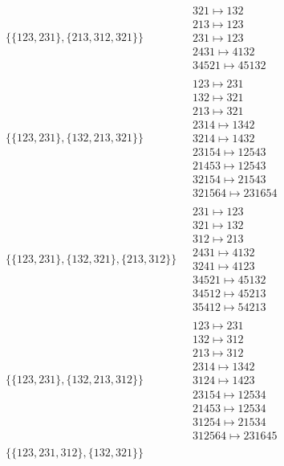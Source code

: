 \begin{scriptsize}
\begin{align}
\begin{matrix}
\end{matrix}
\\
\{\{123, 231\}, \{213, 312, 321\}\}
\ 
&
\begin{matrix}
321 \mapsto 132\\213 \mapsto 123\\231 \mapsto 123\\2431 \mapsto 4132\\34521 \mapsto 45132
\end{matrix}
\\
\{\{123, 231\}, \{132, 213, 321\}\}
\ 
&
\begin{matrix}
123 \mapsto 231\\132 \mapsto 321\\213 \mapsto 321\\2314 \mapsto 1342\\3214 \mapsto 1432\\23154 \mapsto 12543\\21453 \mapsto 12543\\32154 \mapsto 21543\\321564 \mapsto 231654
\end{matrix}
\\
\{\{123, 231\}, \{132, 321\}, \{213, 312\}\}
\ 
&
\begin{matrix}
231 \mapsto 123\\321 \mapsto 132\\312 \mapsto 213\\2431 \mapsto 4132\\3241 \mapsto 4123\\34521 \mapsto 45132\\34512 \mapsto 45213\\35412 \mapsto 54213
\end{matrix}
\\
\{\{123, 231\}, \{132, 213, 312\}\}
\ 
&
\begin{matrix}
123 \mapsto 231\\132 \mapsto 312\\213 \mapsto 312\\2314 \mapsto 1342\\3124 \mapsto 1423\\23154 \mapsto 12534\\21453 \mapsto 12534\\31254 \mapsto 21534\\312564 \mapsto 231645
\end{matrix}
\\
\{\{123, 231, 312\}, \{132, 321\}\}
\ 
&
\begin{matrix}

\end{matrix}
\end{align}
\end{scriptsize}
